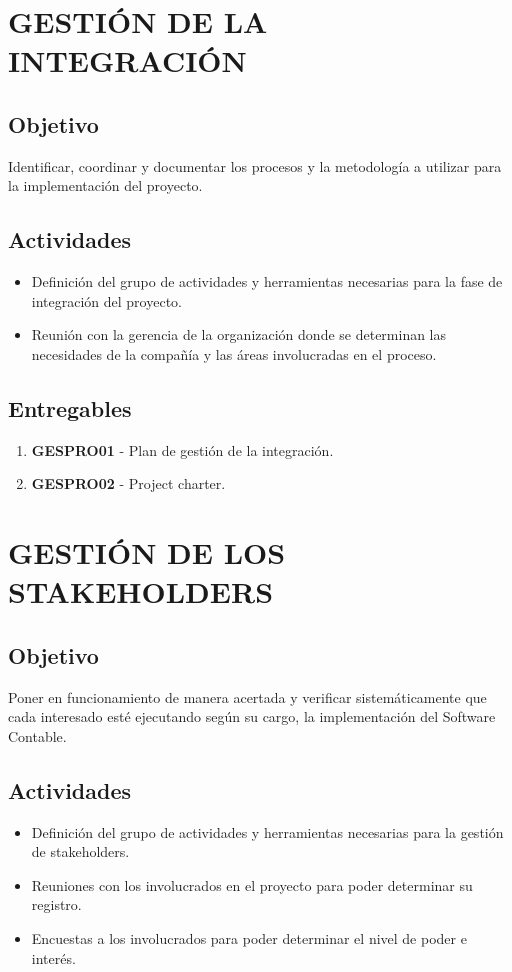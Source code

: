 \chapter{GESTI\'ON DE LA INTEGRACI\'ON}
%
\section{Objetivo}
Identificar, coordinar y documentar los procesos y la metodolog\'ia a utilizar para la implementaci\'on del
proyecto.
%
\section{Actividades}
%
\begin{itemize}
	\item Definici\'on del grupo de actividades y herramientas necesarias para la fase de integraci\'on del 
		proyecto.
	
	\item Reuni\'on con la gerencia de la organizaci\'on donde se determinan las necesidades de la compa\~n\'ia
		y las \'areas involucradas en el proceso.
\end{itemize}

%
\section{Entregables}

\begin{enumerate}
	\item \textbf{GESPRO01} - Plan de gesti\'on de la integraci\'on.
	\item \textbf{GESPRO02} - Project charter.
\end{enumerate}

\chapter{GESTI\'ON DE LOS STAKEHOLDERS}

\section{Objetivo}
Poner en funcionamiento de manera acertada y verificar sistem\'aticamente que cada interesado est\'e
ejecutando seg\'un su cargo, la implementaci\'on del Software Contable.%
%
\section{Actividades}
\begin{itemize}
	\item Definici\'on del grupo de actividades y herramientas necesarias para la gesti\'on de stakeholders.

	\item Reuniones con los involucrados en el proyecto para poder determinar su registro.
	
	\item Encuestas a los involucrados para poder determinar el nivel de poder e inter\'es.
\end{itemize}
%

